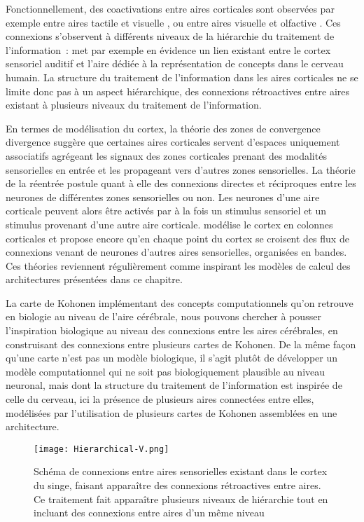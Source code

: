 \documentclass[../main]{subfiles}
\begin{document}
Fonctionnellement, des coactivations entre aires corticales sont observées par exemple entre aires tactile et visuelle \parencite{Sathian2002FeelingWT}, ou entre aires visuelle et olfactive \parencite{Gonzlez2006ReadingCA}.
Ces connexions s'observent à différents niveaux de la hiérarchie du traitement de l'information~: \cite{Kiefer2008TheSO} met par exemple en évidence un lien existant entre le cortex sensoriel auditif et l'aire dédiée à la représentation de concepts dans le cerveau humain.
La structure du traitement de l'information dans les aires corticales ne se limite donc pas à un aspect hiérarchique, des connexions rétroactives entre aires existant à plusieurs niveaux du traitement de l'information.

En termes de modélisation du cortex, la théorie des zones de convergence divergence \parencite{damasio_time-locked_1989} suggère que certaines aires corticales servent d'espaces uniquement associatifs agrégeant les signaux des zones corticales prenant des modalités sensorielles en entrée et les propageant vers d'autres zones sensorielles. 
La théorie de la réentrée \parencite{Edelman1982GroupSA} postule quant à elle des connexions directes et réciproques entre les neurones de différentes zones sensorielles ou non. Les neurones d'une aire corticale peuvent alors être activés par à la fois un stimulus sensoriel et un stimulus provenant d'une autre aire corticale.
\cite{Burnod1989AnAN} modélise le cortex en colonnes corticales et propose encore qu'en chaque point du cortex se croisent des flux de connexions venant de neurones d'autres aires sensorielles, organisées en bandes. Ces théories reviennent régulièrement comme inspirant les modèles de calcul des architectures présentées dans ce chapitre.

La carte de Kohonen implémentant des concepts computationnels qu'on retrouve en biologie au niveau de l'aire cérébrale, nous pouvons chercher à pousser l'inspiration biologique au niveau des connexions entre les aires cérébrales, en construisant des connexions entre plusieurs cartes de Kohonen.
De la même façon qu'une carte n'est pas un modèle biologique, il s'agit plutôt de développer un modèle computationnel qui ne soit pas biologiquement plausible au niveau neuronal, mais dont la structure du traitement de l'information est inspirée de celle du cerveau, ici la présence de plusieurs aires connectées entre elles, modélisées par l'utilisation de plusieurs cartes de Kohonen assemblées en une architecture.

\begin{figure}
    \centering
    \texttt{[image: Hierarchical-V.png]}
    \caption{Schéma de connexions entre aires sensorielles existant dans le cortex du singe, faisant apparaître des connexions rétroactives entre aires. Ce traitement fait apparaître plusieurs niveaux de hiérarchie tout en incluant des connexions entre aires d'un même niveau \parencite{primate_cortex_91}\label{fig:primate}}
\end{figure}
\end{document}
